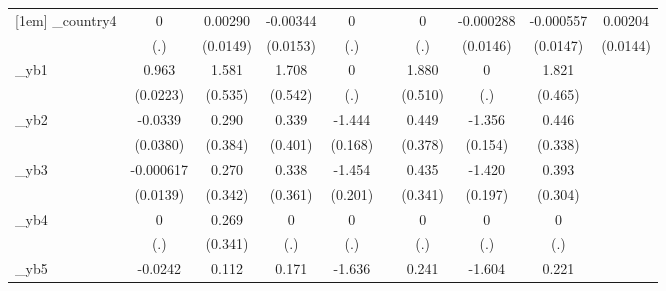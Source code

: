 \begin{table}[htbp]
\begin{tabular}{l*{9}{c}}
[1em]
\_country4   &           0         &     0.00290         &    -0.00344         &           0         &                     &           0         &   -0.000288         &   -0.000557         &     0.00204         \\
            &         (.)         &    (0.0149)         &    (0.0153)         &         (.)         &                     &         (.)         &    (0.0146)         &    (0.0147)         &    (0.0144)         \\
[1em]
\_yb1        &       0.963\sym{***}&       1.581\sym{***}&       1.708\sym{***}&           0         &                     &       1.880\sym{***}&           0         &       1.821\sym{***}&                     \\
            &    (0.0223)         &     (0.535)         &     (0.542)         &         (.)         &                     &     (0.510)         &         (.)         &     (0.465)         &                     \\
[1em]
\_yb2        &     -0.0339         &       0.290         &       0.339         &      -1.444\sym{***}&                     &       0.449         &      -1.356\sym{***}&       0.446         &                     \\
            &    (0.0380)         &     (0.384)         &     (0.401)         &     (0.168)         &                     &     (0.378)         &     (0.154)         &     (0.338)         &                     \\
[1em]
\_yb3        &   -0.000617         &       0.270         &       0.338         &      -1.454\sym{***}&                     &       0.435         &      -1.420\sym{***}&       0.393         &                     \\
            &    (0.0139)         &     (0.342)         &     (0.361)         &     (0.201)         &                     &     (0.341)         &     (0.197)         &     (0.304)         &                     \\
[1em]
\_yb4        &           0         &       0.269         &           0         &           0         &                     &           0         &           0         &           0         &                     \\
            &         (.)         &     (0.341)         &         (.)         &         (.)         &                     &         (.)         &         (.)         &         (.)         &                     \\
[1em]
\_yb5        &     -0.0242         &       0.112         &       0.171         &      -1.636\sym{***}&                     &       0.241         &      -1.604\sym{***}&       0.221         &                     \\

\end{tabular}
\end{table}
